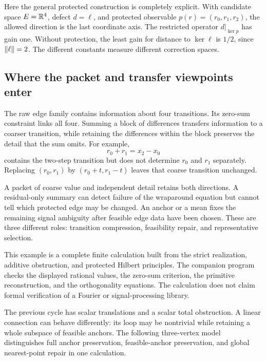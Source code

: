 Here the general protected construction is completely explicit. With candidate space \(E=\mathbb R^4\), defect \(d=\ell\), and protected observable \(p(r)=(r_0,r_1,r_2)\), the allowed direction is the last coordinate axis. The restricted operator \(d|_{\ker p}\) has gain one. Without protection, the least gain for distance to \(\ker\ell\) is \(1/2\), since \(\left\lVert\ell\right\rVert=2\). The different constants measure different correction spaces.

\subsection{Where the packet and transfer viewpoints enter}
The raw edge family contains information about four transitions. Its zero-sum constraint links all four. Summing a block of differences transfers information to a coarser transition, while retaining the differences within the block preserves the detail that the sum omits. For example,
\[
 r_0+r_1=x_2-x_0
\]
contains the two-step transition but does not determine \(r_0\) and \(r_1\) separately. Replacing \((r_0,r_1)\) by \((r_0+t,r_1-t)\) leaves that coarse transition unchanged.

A packet of coarse value and independent detail retains both directions. A residual-only summary can detect failure of the wraparound equation but cannot tell which protected edge may be changed. An anchor or a mean fixes the remaining signal ambiguity after feasible edge data have been chosen. These are three different roles: transition compression, feasibility repair, and representative selection.

This example is a complete finite calculation built from the strict realization, additive obstruction, and protected Hilbert principles. The companion program checks the displayed rational values, the zero-sum criterion, the primitive reconstruction, and the orthogonality equations. The calculation does not claim formal verification of a Fourier or signal-processing library.

\label{KS:sec:twisted-loop}
The previous cycle has scalar translations and a scalar total obstruction. A linear connection can behave differently: its loop may be nontrivial while retaining a whole subspace of feasible anchors. The following three-vertex model distinguishes full anchor preservation, feasible-anchor preservation, and global nearest-point repair in one calculation.

